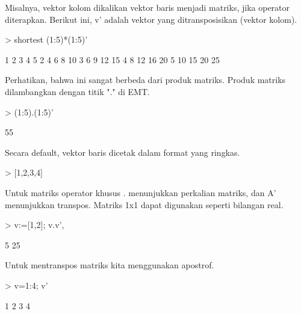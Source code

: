 \documentclass[a4paper,10pt]{article}
\begin{document}
\begin{eulernotebook}
\begin{eulercomment}
\begin{eulercomment}
\begin{eulercomment}
\begin{eulercomment}
\begin{eulercomment}
\begin{eulercomment}
\begin{eulercomment}
Misalnya, vektor kolom dikalikan vektor baris menjadi matriks, jika
operator diterapkan. Berikut ini, v' adalah vektor yang
ditransposisikan (vektor kolom).
\end{eulercomment}
\begin{eulerprompt}
> shortest (1:5)*(1:5)'
\end{eulerprompt}
\begin{euleroutput}
       1      2      3      4      5 
       2      4      6      8     10 
       3      6      9     12     15 
       4      8     12     16     20 
       5     10     15     20     25 
\end{euleroutput}
\begin{eulercomment}
Perhatikan, bahwa ini sangat berbeda dari produk matriks. Produk
matriks dilambangkan dengan titik "." di EMT.
\end{eulercomment}
\begin{eulerprompt}
> (1:5).(1:5)'
\end{eulerprompt}
\begin{euleroutput}
  55
\end{euleroutput}
\begin{eulercomment}
Secara default, vektor baris dicetak dalam format yang ringkas.
\end{eulercomment}
\begin{eulerprompt}
> [1,2,3,4]
\end{eulerprompt}
\begin{euleroutput}
  [1,  2,  3,  4]
\end{euleroutput}
\begin{eulercomment}
Untuk matriks operator khusus . menunjukkan perkalian matriks, dan A'
menunjukkan transpos. Matriks 1x1 dapat digunakan seperti bilangan
real.
\end{eulercomment}
\begin{eulerprompt}
> v:=[1,2]; v.v', %
\end{eulerprompt}
\begin{euleroutput}
  5
  25
\end{euleroutput}
\begin{eulercomment}
Untuk mentranspos matriks kita menggunakan apostrof.
\end{eulercomment}
\begin{eulerprompt}
> v=1:4; v'
\end{eulerprompt}
\begin{euleroutput}
              1 
              2 
              3 
              4 
\end{euleroutput}

\end{eulercomment}
\end{eulercomment}
\end{eulercomment}
\end{eulercomment}
\end{eulercomment}
\end{eulercomment}
\end{eulernotebook}
\end{document}
